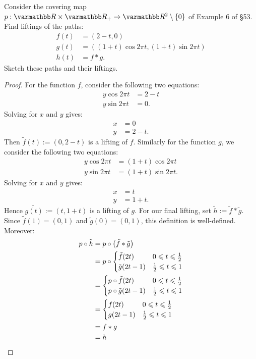 \documentclass[10pt,oneside,openany]{memoir}
\begin{document}
\begin{exercise}[manual-num={4}]
	Consider the covering map $p: \bfR \times \bfR_+ \rightarrow \bfR^2 \setminus \{0\}$ of Example 6 of \S 53. Find liftings of the paths:
	\begin{align*}
		f(t) &= (2-t,0) \\
		g(t) &= ((1+t)\cos 2\pi t, (1+t) \sin 2\pi t) \\
		h(t) &= f \ast g. 
	\end{align*}
	Sketch these paths and their liftings.
\end{exercise}
	\begin{proof}
		For the function $f$, consider the following two equations:
		\begin{align*}
			y \cos 2\pi t &= 2-t \\
			y \sin 2 \pi t &= 0.
		\end{align*}
		Solving for $x$ and $y$ gives:
		\begin{align*}
			x &= 0 \\
			y &= 2 - t.
		\end{align*}
		Then $\tilde{f}(t) := (0,2-t)$ is a lifting of $f$. Similarly for the function $g$, we consider the following two equations:
		\begin{align*}
			y \cos 2\pi t &= (1+t)\cos 2\pi t \\
			y \sin 2 \pi t &= (1+t) \sin 2 \pi t.
		\end{align*}
		Solving for $x$ and $y$ gives:
		\begin{align*}
			x &= t \\
			y &= 1+t.
		\end{align*}
		Hence $\tilde{g(t)}:= (t,1+t)$ is a lifting of $g$. For our final lifting, set $\tilde{h}:= \tilde{f} \ast \tilde{g}$. Since $\tilde{f}(1) = (0,1)$ and $\tilde{g}(0) = (0,1)$, this definition is well-defined. Moreover:
\begin{align*}
p \circ \tilde{h} &= p \circ \bigl(\tilde{f} * \tilde{g}\bigr) \\
&= p \circ
\begin{cases}
\tilde{f}(2t) & 0 \leq t \leq \frac{1}{2} \\
\tilde{g}(2t-1) & \frac{1}{2} \leq t \leq 1
\end{cases} \\
&=
\begin{cases}
p \circ \tilde{f}(2t) & 0 \leq t \leq \frac{1}{2} \\
p \circ \tilde{g}(2t-1) & \frac{1}{2} \leq t \leq 1
\end{cases} \\
&=
\begin{cases}
f(2t) & 0 \leq t \leq \frac{1}{2} \\
g(2t-1) & \frac{1}{2} \leq t \leq 1
\end{cases} \\
&= f * g \\
&= h \qedhere
\end{align*}
	\end{proof}
\end{document}
